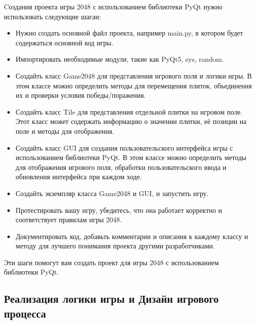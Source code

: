 Cоздания проекта игры 2048 с использованием библиотеки PyQt нужно использовать следующие шагаи:
\begin{itemize}
\item Нужно создать основной файл проекта, например main.py, в котором будет содержаться основной код игры.

\item Импортировать необходимые модули, такие как PyQt5, sys, random.

\item Создайть класс Game2048 для представления игрового поля и логики игры. В этом классе  можно определить методы для перемещения плиток, объединения их и проверки условия победы/поражения.

\item Создайть класс Tile для представления отдельной плитки на игровом поле. Этот класс может содержать информацию о значении плитки, её позиции на поле и методы для отображения.

\item Создайть класс GUI для создания пользовательского интерфейса игры с использованием библиотеки PyQt. В этом классе можно определить методы для отображения игрового поля, обработки пользовательского ввода и обновления интерфейса при каждом ходе.

\item Создайть экземпляр класса Game2048 и GUI, и запустить игру.

\item Протестировать вашу игру, убедитесь, что она работает корректно и соответствует правилам игры 2048.

\item Документировать код, добавьть комментарии и описания к каждому классу и методу для лучшего понимания проекта другими разработчиками.
\end{itemize}
Эти шаги помогут вам создать проект для игры 2048 с использованием библиотеки PyQt.

\subsection{\label{subsec:ch01/sec01/sub02}Реализация логики игры и Дизайн игрового процесса}

